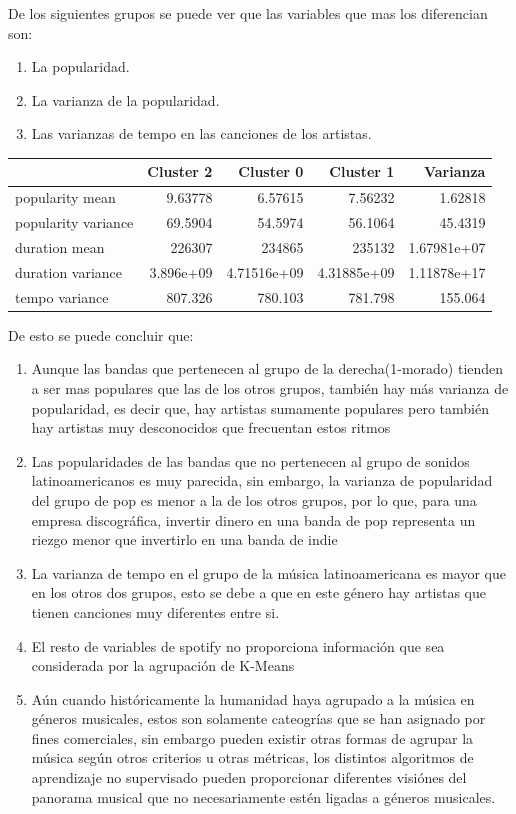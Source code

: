 \documentclass[11pt]{article}
\begin{document}
De los siguientes grupos se puede ver que las variables que mas los diferencian
son:
\begin{enumerate}
\item La popularidad.
\item La varianza de la popularidad.
\item Las varianzas de tempo en las canciones de los artistas.
\end{enumerate}

\begin{center}
\begin{tabular}{lrrrr}
 & Cluster 2 & Cluster 0 & Cluster 1 & Varianza\\
\hline
popularity mean & 9.63778 & 6.57615 & 7.56232 & 1.62818\\
popularity variance & 69.5904 & 54.5974 & 56.1064 & 45.4319\\
duration mean & 226307 & 234865 & 235132 & 1.67981e+07\\
duration variance & 3.896e+09 & 4.71516e+09 & 4.31885e+09 & 1.11878e+17\\
tempo variance & 807.326 & 780.103 & 781.798 & 155.064\\
\end{tabular}
\end{center}

De esto se puede concluir que:

\begin{enumerate}
\item Aunque las bandas que pertenecen al grupo de la derecha(1-morado) tienden a ser mas populares que las de los otros grupos, también hay más varianza de popularidad, es decir que, hay artistas sumamente populares pero también hay artistas muy desconocidos que frecuentan estos ritmos
\item Las popularidades de las bandas que no pertenecen al grupo de sonidos latinoamericanos es muy parecida, sin embargo, la varianza de popularidad del grupo de pop es menor a la de los otros grupos, por lo que, para una empresa discográfica, invertir dinero en una banda de pop representa un riezgo menor que invertirlo en una banda de indie
\item La varianza de tempo en el grupo de la música latinoamericana es mayor que en los otros dos grupos, esto se debe a que en este género hay artistas que tienen canciones muy diferentes entre si.
\item El resto de variables de spotify no proporciona información que sea considerada por la agrupación de K-Means
\item Aún cuando históricamente la humanidad haya agrupado a la música en géneros musicales, estos son solamente cateogrías que se han asignado por fines comerciales, sin embargo pueden existir otras formas de agrupar la música según otros criterios u otras métricas, los distintos algoritmos de aprendizaje no supervisado pueden proporcionar diferentes visiónes del panorama musical que no necesariamente estén ligadas a géneros musicales.
\end{enumerate}
\end{document}
